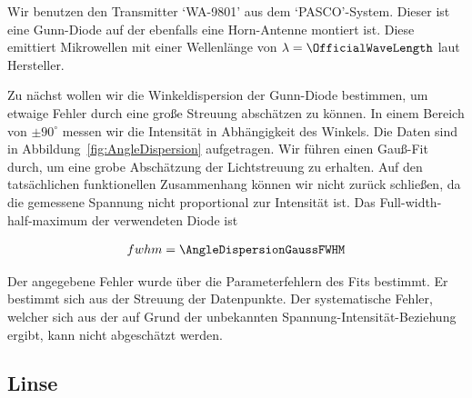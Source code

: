 \documentclass[a4paper,10pt,twocolumn]{article}
\begin{document}
    Wir benutzen den Transmitter `WA-9801' aus dem `PASCO'-System.
    Dieser ist eine Gunn-Diode auf der ebenfalls eine Horn-Antenne montiert ist.
    Diese emittiert Mikrowellen mit einer Wellenlänge von $\lambda = \OfficialWaveLength$ laut Hersteller.
    
    Zu nächst wollen wir die Winkeldispersion der Gunn-Diode bestimmen, um etwaige Fehler durch eine
    große Streuung abschätzen zu können.
    In einem Bereich von $\pm 90 ^{\circ}$ messen wir die Intensität in Abhängigkeit des Winkels.
    Die Daten sind in Abbildung~\ref{fig:AngleDispersion} aufgetragen.
    Wir führen einen Gauß-Fit durch, um eine grobe Abschätzung der Lichtstreuung zu erhalten.
    Auf den tatsächlichen funktionellen Zusammenhang können wir nicht zurück schließen, da die gemessene Spannung
    nicht proportional zur Intensität ist.
    Das Full-width-half-maximum der verwendeten Diode ist
    
    \begin{align*}
        fwhm = \AngleDispersionGaussFWHM
    \end{align*}
    
    Der angegebene Fehler wurde über die Parameterfehlern des Fits bestimmt.
    Er bestimmt sich aus der Streuung der Datenpunkte.
    Der systematische Fehler, welcher sich aus der auf Grund der unbekannten Spannung-Intensität-Beziehung ergibt, kann
    nicht abgeschätzt werden.
    
    \subsection{Linse}

    
\end{document}
